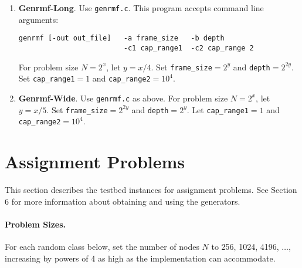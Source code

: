 \begin{enumerate}
\item {\bf Genrmf-Long}.  Use {\tt genrmf.c}. 
This program accepts command line arguments:
\begin{verbatim}
genrmf [-out out_file]   -a frame_size   -b depth 
                         -c1 cap_range1  -c2 cap_range 2
\end{verbatim} 
For problem size $N = 2^x$,  let $y = x/4$. 
Set {\tt frame\_size}$ = 2^{y}$
and {\tt depth}$ = 2^{2y}$.  Set {\tt cap\_range1}$ = 1$ 
and {\tt cap\_range2}$ = 10^4$.  

\item{\bf Genrmf-Wide}.  Use {\tt genrmf.c} as above.  
For problem size  $N = 2^x$, let $y = x/5$.   Set 
{\tt frame\_size}$  = 2^{2y}$ and {\tt depth}$ = 2^{y}$.  
Let {\tt cap\_range1}$ = 1$ and {\tt cap\_range2}$ = 10^4$.  
\end{enumerate} 

\section{Assignment Problems}

This section describes the testbed instances for assignment problems. 
See Section 6 for more information about obtaining and using the generators. 

\paragraph{Problem Sizes.}    
For each random class below, set the number of nodes $N$ to 
256, 1024, 4196, $\ldots$, increasing by powers of 4 as high
as the implementation can accommodate. 

